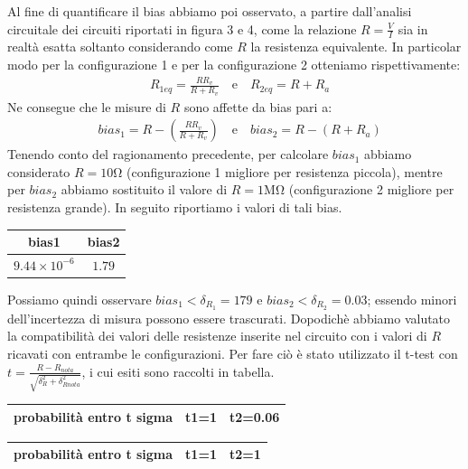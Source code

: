 \documentclass[a4paper]{article}
\begin{document}
Al fine di quantificare il bias abbiamo poi osservato, a partire dall'analisi circuitale dei circuiti riportati in figura 3 e 4, come la relazione \(R=\frac{V}{I}\) sia in realtà esatta soltanto considerando come \(R\) la resistenza equivalente. In particolar modo per la configurazione 1 e per la configurazione 2 otteniamo rispettivamente:
\begin{align*}
	 & R_{1eq}=\frac{RR_v}{R+R_v} \quad \text{e} \quad R_{2eq}=R+R_a
\end{align*}
Ne consegue che le misure di \(R\) sono affette da bias pari a:
\begin{align*}
	 & bias_1= R-(\frac{RR_v}{R+R_v})  \quad \text{e} \quad bias_2=R-(R+R_a)
\end{align*}
Tenendo conto del ragionamento precedente, per calcolare \(bias_1\) abbiamo considerato \(R = 10\si{\ohm}\) (configurazione 1 migliore per resistenza piccola), mentre per \(bias_2\) abbiamo sostituito il valore di \(R=1\si{\mega\ohm}\) (configurazione 2 migliore per resistenza grande).
In seguito riportiamo i valori di tali bias.

\begin{center}
\begin{tabular}{|c|c|}
\hline
bias1 & bias2 \\
\hline
$9.44\times 10^{-6}$ & $1.79$ \\
\hline
\end{tabular}
\end{center}

Possiamo quindi osservare \(bias_1 < \delta_{R_1} = 179\) e \(bias_2 < \delta_{R_2} = 0.03\); essendo minori dell'incertezza di misura possono essere trascurati.
Dopodichè abbiamo valutato la compatibilità dei valori delle resistenze inserite nel circuito con i valori di \(R\) ricavati con entrambe le configurazioni. Per fare ciò è stato utilizzato il t-test con \( t = \frac {R - R_{nota}}{\sqrt{\delta_{R}^2+\delta_{R{nota}}^2}} \), i cui esiti sono raccolti in tabella.

\begin{center}
\begin{tabular}{|l|c|c|}
\hline
probabilità entro t sigma & t1=1 & t2=0.06 \\
\hline
\end{tabular}
\end{center}

\begin{center}
\begin{tabular}{|l|c|c|}
\hline
probabilità entro t sigma & t1=1 & t2=1 \\
\hline
\end{tabular}
\end{center}
\end{document}
